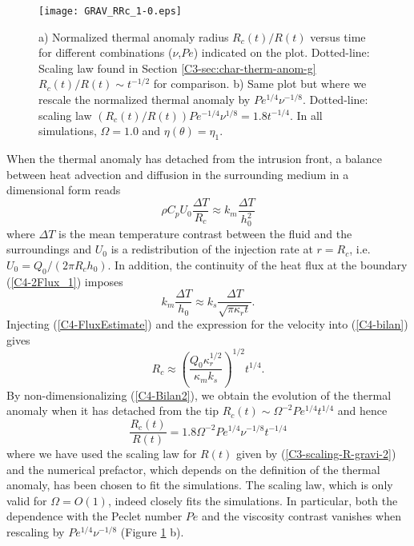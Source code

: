 \begin{figure}[h!]
  \begin{center}
    \graphicspath{ {/Users/thorey/Documents/These/Projet/Refroidissement/Skin_Model/Figure/Figure_Heating/} }
    \texttt{[image: GRAV\_RRc\_1-0.eps]}
    \caption{a) Normalized thermal anomaly radius $R_c(t)/R(t)$ versus
      time for  different combinations  ($\nu$,$Pe$) indicated  on the
      plot.     Dotted-line:   Scaling    law    found   in    Section
      \ref{C3-sec:char-therm-anom-g}  $R_c(t)/R(t)\sim  t^{-1/2}$  for
      comparison.  b)  Same plot but  where we rescale  the normalized
      thermal anomaly  by $Pe^{1/4}\nu^{-1/8}$.   Dotted-line: scaling
      law  $(R_c(t)/R(t))Pe^{-1/4}\nu^{1/8}=   1.8t^{-1/4}$.   In  all
      simulations, $\Omega=1.0$ and $\eta(\theta)=\eta_1$.}
    \label{C4-GRAV_RRc_RArrhenius_1-0}
  \end{center}
\end{figure}

When  the thermal  anomaly has  detached from  the intrusion  front, a
balance between heat advection and diffusion in the surrounding medium
in a dimensional form reads
\begin{equation}
  \rho C_p U_0 \frac{\Delta T}{R_c} \approx k_m \frac{\Delta T}{h_0^2}
  \label{C4-bilan}
\end{equation}
where $\Delta  T$ is the  mean temperature contrast between  the fluid
and the  surroundings and $U_0$  is a redistribution of  the injection
rate at  $r=R_c$, i.e.   $U_0=Q_0/(2\pi R_c  h_0)$.  In  addition, the
continuity of the heat flux at the boundary (\ref{C4-2Flux_1}) imposes
\begin{equation}
  k_m\frac{\Delta   T}{h_0}\approx   k_s   \frac{\Delta   T}{\sqrt{\pi
      \kappa_r t}}.
  \label{C4-FluxEstimate}
\end{equation}
Injecting (\ref{C4-FluxEstimate}) and the  expression for the velocity
into (\ref{C4-bilan}) gives
\begin{equation}
  R_c \approx  \left(\frac{Q_0\kappa_r^{1/2}}{\kappa_m k_s}\right)^{1/2}
  t^{1/4}.
  \label{C4-Bilan2}
\end{equation}
By non-dimensionalizing (\ref{C4-Bilan2}), we  obtain the evolution of
the   thermal   anomaly   when   it  has   detached   from   the   tip
$R_c(t)\sim \Omega^{-2}Pe^{1/4}t^{1/4}$ and hence
\begin{equation}
  \frac{R_c(t)}{R(t)} = 1.8\Omega^{-2}Pe^{1/4}\nu^{-1/8}t^{-1/4}
  \label{C4-Rc}
\end{equation}
where   we  have   used  the   scaling   law  for   $R(t)$  given   by
(\ref{C3-scaling-R-gravi-2})  and   the  numerical   prefactor,  which
depends on the  definition of the thermal anomaly, has  been chosen to
fit  the  simulations.  The  scaling  law,  which  is only  valid  for
$\Omega = O(1)$,  indeed closely fits the  simulations. In particular,
both  the dependence  with the  Peclet number  $Pe$ and  the viscosity
contrast  vanishes  when  rescaling  by  $Pe^{1/4}\nu^{-1/8}$  (Figure
\ref{C4-GRAV_RRc_RArrhenius_1-0} b).

